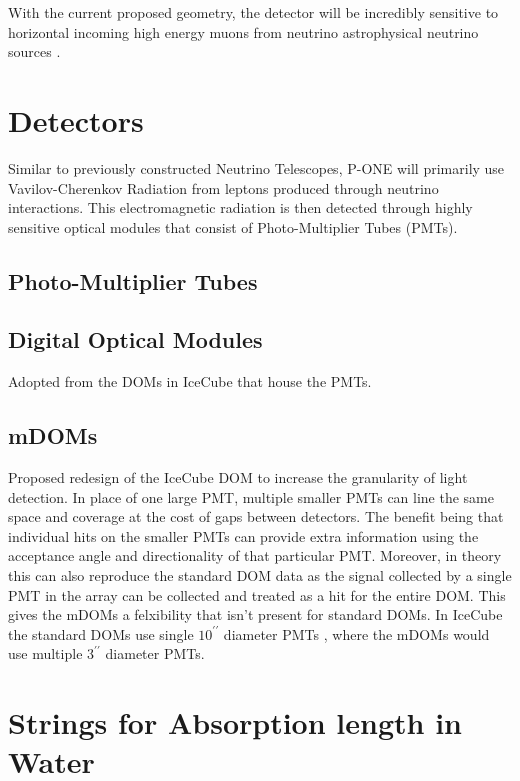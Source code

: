 With the current proposed geometry, the detector will be incredibly sensitive to horizontal incoming high energy muons from neutrino astrophysical neutrino sources \cite{pone}. 

\section{Detectors}
Similar to previously constructed Neutrino Telescopes, P-ONE will primarily use Vavilov-Cherenkov Radiation from leptons produced through neutrino interactions. This electromagnetic radiation is then detected through highly sensitive optical modules that consist of Photo-Multiplier Tubes (PMTs).

\subsection{Photo-Multiplier Tubes}



\subsection{Digital Optical Modules}

Adopted from the DOMs in IceCube that house the PMTs.

\subsection{mDOMs}

Proposed redesign of the IceCube DOM to increase the granularity of light detection. In place of one large PMT, multiple smaller PMTs can line the same space and coverage at the cost of gaps between detectors. The benefit being that individual hits on the smaller PMTs can provide extra information using the acceptance angle and directionality of that particular PMT. Moreover, in theory this can also reproduce the standard DOM data as the signal collected by a single PMT in the array can be collected and treated as a hit for the entire DOM. This gives the mDOMs a felxibility that isn't present for standard DOMs. In IceCube the standard DOMs use single $10^{\prime\prime}$ diameter PMTs \cite{icecube}, where the mDOMs would use multiple $3^{\prime\prime}$ diameter PMTs. 

\section{Strings for Absorption length in Water}

